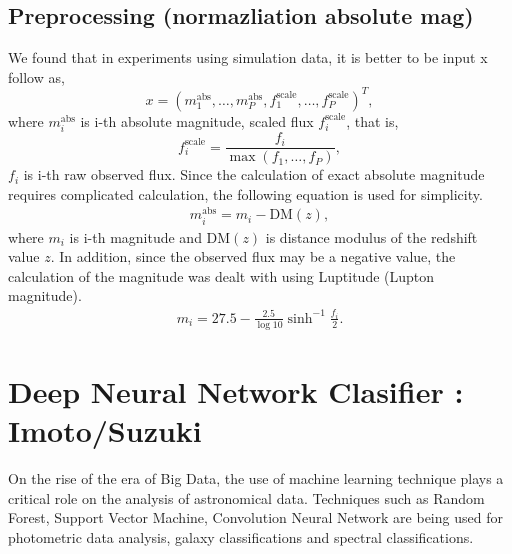 \documentclass[useamsfonts]{pasj01}
\begin{document}
\subsection{Preprocessing (normazliation absolute mag)}
We found that in experiments using simulation data, it is better to be input x follow as,
\begin{equation}
    x = \left( m_1^\mathrm{abs}, \ldots, m_P^\mathrm{abs}, f_{1}^{\mathrm{scale}}, \ldots, f_{P}^{\mathrm{scale}} \right)^T,
\end{equation}
where $m_i^\mathrm{abs}$ is i-th absolute magnitude, scaled flux $f_{i}^{\mathrm{scale}}$, that is,
\begin{equation}
    f_{i}^{\mathrm{scale}} = \frac{f_i}{\max \left(f_1, \ldots, f_P \right)},    \label{eq:scaled_flux}
\end{equation}
$f_i$ is i-th raw observed flux.
Since the calculation of exact absolute magnitude requires complicated calculation, the following equation is used for simplicity.
\begin{eqnarray}
    m_i^\mathrm{abs} = m_i - \mathrm{DM}\left(z\right),
\end{eqnarray}
where $m_i$ is i-th magnitude and $\mathrm{DM}\left(z\right)$ is distance modulus of the redshift value $z$.
In addition, since the observed flux may be a negative value, the calculation of the magnitude was dealt with using Luptitude (Lupton magnitude). %
\begin{eqnarray}
    m_i = 27.5 - \frac{2.5}{\log 10} \sinh^{-1} \frac{f_i}{2}. \label{eq:mag} 
\end{eqnarray}

\section{Deep Neural Network Clasifier : Imoto/Suzuki}
On the rise of the era of Big Data, the use of machine learning technique plays a critical role on the analysis of astronomical data.  Techniques such as Random Forest, Support Vector Machine, Convolution Neural Network are being used for photometric data analysis, galaxy classifications and spectral classifications.
\end{document}
